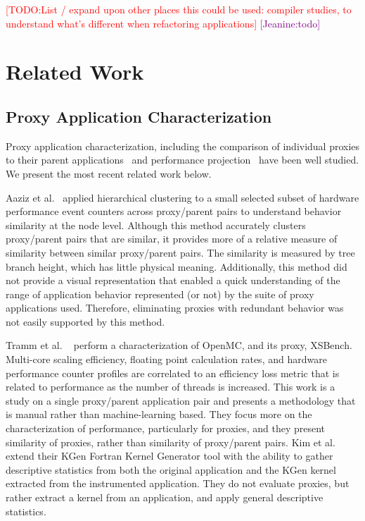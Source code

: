 \documentclass[conference]{IEEEtran}
\newcommand{\jeanine}[1]           {\textcolor{purple}{[Jeanine:#1]}}
\newcommand{\todo}[1]           {\textcolor{red}{[TODO:#1]}}
\begin{document}
\todo{List / expand upon other places this could be used: compiler studies, to understand what's different when refactoring applications}  \jeanine{todo}

\section{Related Work}
\subsection{Proxy Application Characterization}
Proxy application characterization, including the comparison of individual proxies to their parent applications~\cite{BARRETT2015107, Islam:2016:MLF:3014904.3014966, 8049024, CPE:CPE3587} and performance projection~\cite{barrett2012navigating, sharkawi2009performance,8049025} have been well studied. We present the most recent related work below. 

Aaziz et al.~\cite{8514880} applied hierarchical clustering to a small selected subset of hardware performance event counters across proxy/parent pairs to understand behavior similarity at the node level. Although this method accurately clusters proxy/parent pairs that are similar, it provides more of a relative measure of similarity between similar proxy/parent pairs.  The similarity is measured by tree branch height, which has little physical
meaning. Additionally, this method did not provide a visual representation that enabled a quick understanding of the range of application behavior represented (or not) by the suite of proxy applications used. Therefore, eliminating proxies with redundant behavior was not easily supported by this method.

Tramm et al. ~\cite{XSBench} perform a characterization of OpenMC, and its proxy, XSBench. Multi-core scaling efficiency, floating point calculation rates, and hardware performance counter profiles are correlated to an efficiency loss metric that is related to performance as the number of threads is increased.  This work is a study on a single proxy/parent application pair and presents a methodology that is manual rather than machine-learning based. They focus more on the characterization of performance, particularly for proxies, and they present similarity of proxies, rather than similarity of proxy/parent pairs.  Kim et al.~\cite{8049024} extend their KGen Fortran Kernel Generator tool with the ability to gather descriptive statistics from both the original application and the KGen kernel extracted from the instrumented application. They do not evaluate proxies, but rather extract a kernel from an application, and apply general descriptive statistics.
\end{document}
